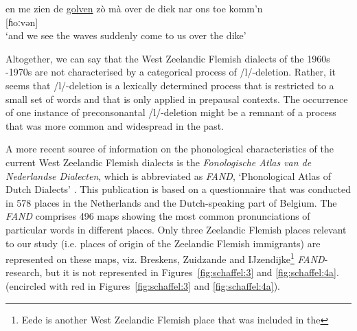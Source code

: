 \documentclass[output=paper,hidelinks,draftmode]{langscibook}
\begin{document}
\ea%
    \label{ex:schaffel:9}

\gll en me zien de \ul{golven} zò mà over de diek nar ons toe komm’n\footnotemark{} \\
{} {} {} {} [ɦoːvən] {} {} {} {} {} {} {} {}\\
\glt ‘and we see the waves suddenly come to us over the dike’

\z


Altogether, we can say that the West Zeelandic Flemish dialects of the 1960s -1970s are not characterised by a categorical process of /l/-deletion. Rather, it seems that /l/-deletion is a lexically determined process that is restricted to a small set of words and that is only applied in prepausal contexts. The occurrence of one instance of preconsonantal /l/-deletion might be a remnant of a process that was more common and widespread in the past. 

A more recent source of information on the phonological characteristics of the current West Zeelandic Flemish dialects is the \textit{Fonologische Atlas van de Nederlandse Dialecten}, which is abbreviated as \textit{FAND}, ‘Phonological Atlas of Dutch Dialects’ \citep{DeWulfTaeldeman2005}. This publication is based on a questionnaire that was conducted in 578 places in the Netherlands and the Dutch-speaking part of Belgium. The \textit{FAND} comprises 496 maps showing the most common pronunciations of particular words in different places. Only three Zeelandic Flemish places relevant to our study (i.e. places of origin of the Zeelandic Flemish immigrants) are represented on these maps, viz. Breskens, Zuidzande and IJzendijke\footnote{Eede is another West Zeelandic Flemish place that was included in the} {\textit{FAND}}{{}-research, but it is not represented in Figures~\ref{fig:schaffel:3} and \ref{fig:schaffel:4a}.} (encircled with red in Figures~\ref{fig:schaffel:3} and \ref{fig:schaffel:4a}).
\end{document}
